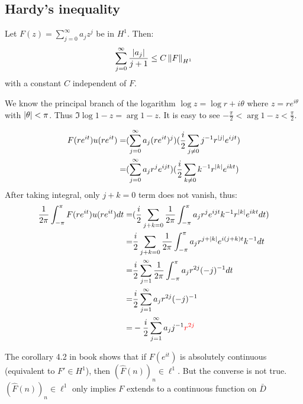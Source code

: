 \subsection{Hardy's inequality}
\begin{theorem}\label{Hardy's inequality}
    Let $F(z)=\sum_{j=0}^{\infty}{a_jz^j}$ be in $H^1$. Then:
    \begin{equation*}
        \sum_{j=0}^\infty{\frac{\left\lvert a_j\right\rvert}{j+1}}\leq C\left\lVert F\right\rVert_{H^1}
    \end{equation*}
    with a constant $C$ independent of $F$.
\end{theorem}
\begin{remark}
    We know the principal branch of the logarithm $\log{z}=\log{r}+i\theta$ where $z=re^{i\theta}$ with $\left\lvert\theta\right\rvert<\pi$. Thus
    $\Im{\log{1-z}}=\arg{1-z}$. It is easy to see $-\frac{\pi}{2}<\arg{1-z}<\frac{\pi}{2}$.\par
    \begin{align*}
        F(re^{it})u(re^{it})= & (\sum_{j=0}^{\infty}{a_j(re^{it})^j})(\frac{i}{2}\sum_{j\neq 0}{j^{-1}r^{\left\lvert j\right\rvert}e^{i j t}})    \\
        =                     & (\sum_{j=0}^{\infty}{a_j r^j e^{i j t}})(\frac{i}{2}\sum_{k\neq 0}{k^{-1}r^{\left\lvert k\right\rvert}e^{i k t}})
    \end{align*}
    After taking integral, only $j+k=0$ term does not vanish, thus:
    \begin{align*}
        \frac{1}{2\pi}\int_{-\pi}^{\pi}F(re^{it})u(re^{it})d t= & (\frac{i}{2}\sum_{j+k=0}\frac{1}{2\pi}\int_{-\pi}^{\pi}{a_j r^j e^{i j t}k^{-1}r^{\left\lvert k\right\rvert}e^{i k t}}d t) \\
        =                                                       & \frac{i}{2}\sum_{j+k=0}\frac{1}{2\pi}\int_{-\pi}^{\pi}{a_j r^{j+\left\lvert k\right\rvert}e^{i(j+k)t}k^{-1}}d t            \\
        =                                                       & \frac{i}{2}\sum_{j=1}^{\infty}\frac{1}{2\pi}\int_{-\pi}^{\pi}{a_j r^{2j}(-j)^{-1}}d t                    \\
        =                                                       & \frac{i}{2}\sum_{j=1}^{\infty}{a_j r^{2j}(-j)^{-1}}                                                      \\
        =                                                       & -\frac{i}{2}\sum_{j=1}^{\infty}{a_j j^{-1}{\color{red}r^{2j}}}
    \end{align*}
\end{remark}
The corollary 4.2 in book shows that if $F(e^{it})$ is absolutely continuous (equivalent to $F'\in H^1$), then $(\hat{F}(n))_n\in\ell^1$. But the converse is not true. $(\hat{F}(n))_n\in\ell^1$ only implies $F$ extends to a continuous function on $\bar{D}$

